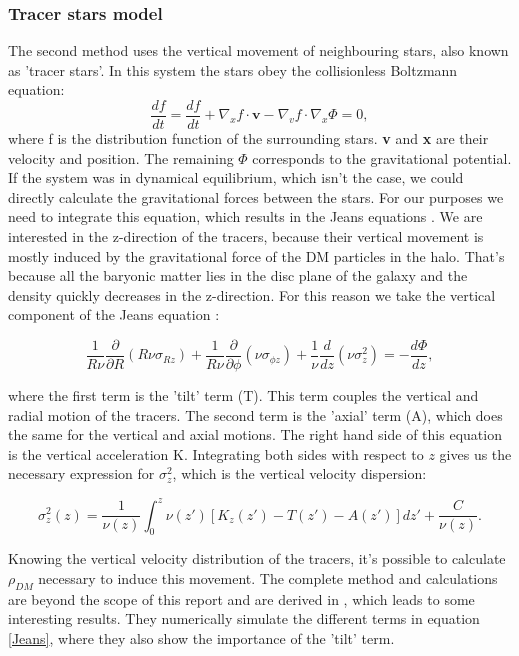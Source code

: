 \documentclass{article}
\begin{document}
\subsubsection{Tracer stars model}
The second method uses the vertical movement of neighbouring stars, also known as 'tracer stars'. In this system the stars obey the collisionless Boltzmann equation:
\begin{equation}
    \frac{df}{dt} = \frac{df}{dt} + \nabla_{x}f\cdot \textbf{v} - \nabla_{v}f\cdot\nabla_{x}\Phi = 0,
\end{equation}
where f is the distribution function of the surrounding stars. \textbf{v} and \textbf{x} are their velocity and position. The remaining $\Phi$ corresponds to the gravitational potential. If the system was in dynamical equilibrium, which isn't the case, we could directly calculate the gravitational forces between the stars. For our purposes we need to integrate this equation, which results in the Jeans equations \cite{Silverwood:2015hxa}. We are interested in the z-direction of the tracers, because their vertical movement is mostly induced by the gravitational force of the DM particles in the halo. That's because all the baryonic matter lies in the disc plane of the galaxy and the density quickly decreases in the z-direction. For this reason we take the vertical component of the Jeans equation \cite{BT2}:

\begin{equation}
    \frac{1}{R\nu}\frac{\partial}{\partial R}(R\nu \sigma_{Rz}) + \frac{1}{R\nu}\frac{\partial}{\partial \phi}(\nu \sigma_{\phi z}) + \frac{1}{\nu}\frac{d}{dz}(\nu \sigma_{z}^{2}) = -\frac{d\Phi}{dz},
    \label{Jeans}
\end{equation}

where the first term is the 'tilt' term (T). This term couples the vertical and radial motion of the tracers. The second term is the 'axial' term (A), which does the same for the vertical and axial motions. The right hand side of this equation is the vertical acceleration K. Integrating both sides with respect to $z$ gives us the necessary expression for $\sigma_{z}^{2}$, which is the vertical velocity dispersion:

\begin{equation}
    \sigma_{z}^{2}(z) = \frac{1}{\nu(z)}\int_0^z\nu(z')[K_{z}(z')-T(z')-A(z')]dz' + \frac{C}{\nu(z)}. 
\end{equation}

Knowing the vertical velocity distribution of the tracers, it's possible to calculate $\rho_{DM}$ necessary to induce this movement. The complete method and calculations are beyond the scope of this report and are derived in \cite{Silverwood:2015hxa}, which leads to some interesting results. They numerically simulate the different terms in equation \ref{Jeans}, where they also show the importance of the 'tilt' term. 
\end{document}
